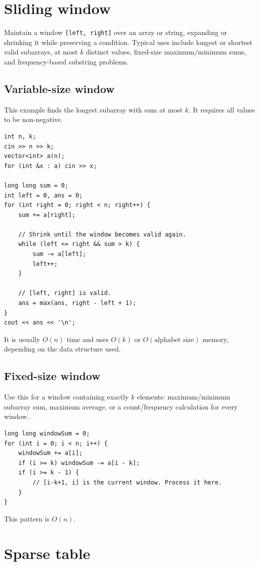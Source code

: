 \section{Sliding window}

Maintain a window \texttt{[left, right]} over an array or string, expanding or shrinking it while preserving a condition. Typical uses include longest or shortest valid subarrays, at most $k$ distinct values, fixed-size maximum/minimum sums, and frequency-based substring problems.

\subsection{Variable-size window}
This example finds the longest subarray with sum at most $k$. It requires all values to be non-negative.

\begin{lstlisting}
int n, k;
cin >> n >> k;
vector<int> a(n);
for (int &x : a) cin >> x;

long long sum = 0;
int left = 0, ans = 0;
for (int right = 0; right < n; right++) {
    sum += a[right];

    // Shrink until the window becomes valid again.
    while (left <= right && sum > k) {
        sum -= a[left];
        left++;
    }

    // [left, right] is valid.
    ans = max(ans, right - left + 1);
}
cout << ans << '\n';
\end{lstlisting}

It is usually $O(n)$ time and uses $O(k)$ or $O(\text{alphabet size})$ memory, depending on the data structure used.

\subsection{Fixed-size window}
Use this for a window containing exactly $k$ elements: maximum/minimum subarray sum, maximum average, or a count/frequency calculation for every window.

\begin{lstlisting}
long long windowSum = 0;
for (int i = 0; i < n; i++) {
    windowSum += a[i];
    if (i >= k) windowSum -= a[i - k];
    if (i >= k - 1) {
        // [i-k+1, i] is the current window. Process it here.
    }
}
\end{lstlisting}
This pattern is $O(n)$.

\section{Sparse table}

